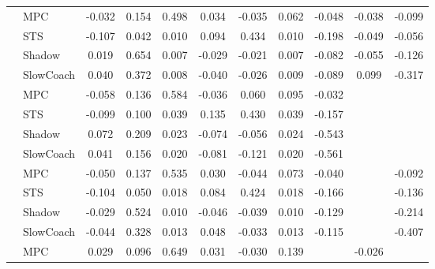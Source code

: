 \begin{tabular}{|l|l|*{9}{c|}}
\midrule
[True, True, True, True, True, True, True, True, True] & MPC &   -0.032 &     0.154 &     0.498 &  0.034 & -0.035 &  0.062 &  -0.048 &  -0.038 &   -0.099 \\
                                                           & STS &   -0.107 &     0.042 &     0.010 &  0.094 &  0.434 &  0.010 &  -0.198 &  -0.049 &   -0.056 \\
                                                           & Shadow &    0.019 &     0.654 &     0.007 & -0.029 & -0.021 &  0.007 &  -0.082 &  -0.055 &   -0.126 \\
                                                           & SlowCoach &    0.040 &     0.372 &     0.008 & -0.040 & -0.026 &  0.009 &  -0.089 &   0.099 &   -0.317 \\
\midrule
[True, True, True, True, True, True, True, False, False] & MPC &   -0.058 &     0.136 &     0.584 & -0.036 &  0.060 &  0.095 &  -0.032 &      &       \\
                                                           & STS &   -0.099 &     0.100 &     0.039 &  0.135 &  0.430 &  0.039 &  -0.157 &      &       \\
                                                           & Shadow &    0.072 &     0.209 &     0.023 & -0.074 & -0.056 &  0.024 &  -0.543 &      &       \\
                                                           & SlowCoach &    0.041 &     0.156 &     0.020 & -0.081 & -0.121 &  0.020 &  -0.561 &      &       \\
\midrule
[True, True, True, True, True, True, True, False, True] & MPC &   -0.050 &     0.137 &     0.535 &  0.030 & -0.044 &  0.073 &  -0.040 &      &   -0.092 \\
                                                           & STS &   -0.104 &     0.050 &     0.018 &  0.084 &  0.424 &  0.018 &  -0.166 &      &   -0.136 \\
                                                           & Shadow &   -0.029 &     0.524 &     0.010 & -0.046 & -0.039 &  0.010 &  -0.129 &      &   -0.214 \\
                                                           & SlowCoach &   -0.044 &     0.328 &     0.013 &  0.048 & -0.033 &  0.013 &  -0.115 &      &   -0.407 \\
\midrule
[True, True, True, True, True, True, False, True, False] & MPC &    0.029 &     0.096 &     0.649 &  0.031 & -0.030 &  0.139 &      &  -0.026 &       \\

\end{tabular}
